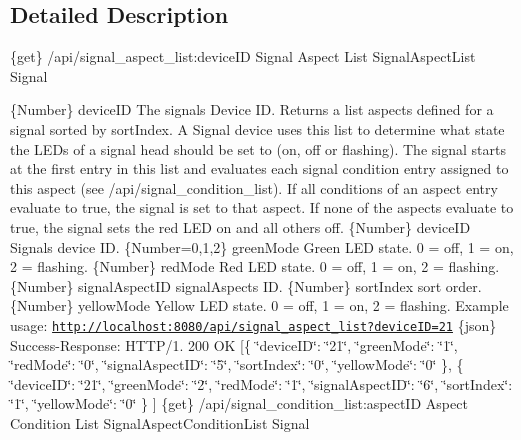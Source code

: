 \subsection{Detailed Description}
\{get\} /api/signal\+\_\+aspect\+\_\+list\+:device\+ID Signal Aspect List  Signal\+Aspect\+List  Signal

\{Number\} device\+ID The signal\textquotesingle{}s Device ID.  Returns a list aspects defined for a signal sorted by sort\+Index. A Signal device uses this list to determine what state the L\+ED\textquotesingle{}s of a signal head should be set to (on, off or flashing). The signal starts at the first entry in this list and evaluates each signal condition entry assigned to this aspect (see /api/signal\+\_\+condition\+\_\+list). If all conditions of an aspect entry evaluate to true, the signal is set to that aspect. If none of the aspects evaluate to true, the signal sets the red L\+ED on and all others off.  \{Number\} device\+ID Signal\textquotesingle{}s device ID.  \{Number=0,1,2\} green\+Mode Green L\+ED state. 0 = off, 1 = on, 2 = flashing.  \{Number\} red\+Mode Red L\+ED state. 0 = off, 1 = on, 2 = flashing.  \{Number\} signal\+Aspect\+ID signal\+Aspect\textquotesingle{}s ID.  \{Number\} sort\+Index sort order.  \{Number\} yellow\+Mode Yellow L\+ED state. 0 = off, 1 = on, 2 = flashing.  Example usage\+: \href{http://localhost:8080/api/signal_aspect_list?deviceID=21}{\tt http\+://localhost\+:8080/api/signal\+\_\+aspect\+\_\+list?device\+I\+D=21}  \{json\} Success-\/\+Response\+: H\+T\+T\+P/1. 200 OK \mbox{[}\{ \char`\"{}device\+I\+D\char`\"{}\+: \char`\"{}21\char`\"{}, \char`\"{}green\+Mode\char`\"{}\+: \char`\"{}1\char`\"{}, \char`\"{}red\+Mode\char`\"{}\+: \char`\"{}0\char`\"{}, \char`\"{}signal\+Aspect\+I\+D\char`\"{}\+: \char`\"{}5\char`\"{}, \char`\"{}sort\+Index\char`\"{}\+: \char`\"{}0\char`\"{}, \char`\"{}yellow\+Mode\char`\"{}\+: \char`\"{}0\char`\"{} \}, \{ \char`\"{}device\+I\+D\char`\"{}\+: \char`\"{}21\char`\"{}, \char`\"{}green\+Mode\char`\"{}\+: \char`\"{}2\char`\"{}, \char`\"{}red\+Mode\char`\"{}\+: \char`\"{}1\char`\"{}, \char`\"{}signal\+Aspect\+I\+D\char`\"{}\+: \char`\"{}6\char`\"{}, \char`\"{}sort\+Index\char`\"{}\+: \char`\"{}1\char`\"{}, \char`\"{}yellow\+Mode\char`\"{}\+: \char`\"{}0\char`\"{} \} \mbox{]}  \{get\} /api/signal\+\_\+condition\+\_\+list\+:aspect\+ID Aspect Condition List  Signal\+Aspect\+Condition\+List  Signal

